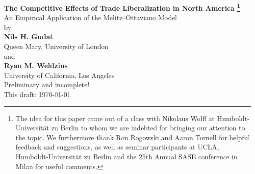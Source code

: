 \documentclass[a4paper,12pt]{article}
\begin{document}
\begin{center}
    

\vspace{2cm}
    \Large{\bf The Competitive Effects of Trade Liberalization in North America \footnote{The idea for this paper came out of a class with Nikolaus Wolff at Humboldt-Universit\"at zu Berlin to whom we are indebted for bringing our attention to the topic. We furthermore thank Ron Rogowski and Aaron Tornell for helpful feedback and suggestions, as well as seminar participants at UCLA, Humboldt-Universit\"at zu Berlin and the 25th Annual SASE conference in Milan for useful comments.}} \\\vspace{0.2cm}
    {\normalsize An Empirical Application of the Melitz--Ottaviano Model} \\\vspace{.5cm}    
    {\normalsize by} \\\vspace{.5cm}
    {\bf Nils H. Gudat} \\
    Queen Mary, University of London \\\vspace{0.5cm}
    and \\\vspace{0.5cm}
    {\bf Ryan M. Weldzius} \\
    University of California, Los Angeles \\\vspace{1cm} 
		Preliminary and incomplete! \\
    This draft: \today \\


\end{center}
\end{document}
